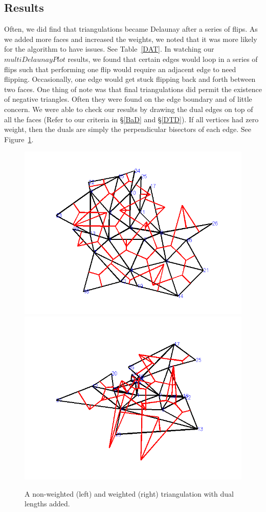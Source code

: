 \documentclass[12pt]{article}
\begin{document}
\subsection{Results}
 Often, we did find that triangulations became Delaunay after a series of flips. As we added more faces and increased the weights, we noted that it was more likely for the algorithm to have issues. See Table~\ref{DAT}. In watching our $multiDelaunayPlot$ results, we found that certain edges would loop in a series of flips such that performing one flip would require an adjacent edge to need flipping. Occasionally, one edge would get stuck flipping back and forth between two faces. One thing of note was that final triangulations did permit the existence of negative triangles. Often they were found on the edge boundary and of little concern. We were able to check our results by drawing the dual edges on top of all the faces (Refer to our criteria in \S\ref{BaD} and \S\ref{DTD}). If all vertices had zero weight, then the duals are simply the perpendicular bisectors of each edge. See Figure~\ref{Duals}. 

\begin{figure}
\centering
\includegraphics[scale = .45]{Pictures/nonwduals.png}
\includegraphics[scale = .45]{Pictures/Wduals.png}
\caption{A non-weighted (left) and weighted (right) triangulation with dual lengths added.}
\label{Duals}
\end{figure}
\end{document}
